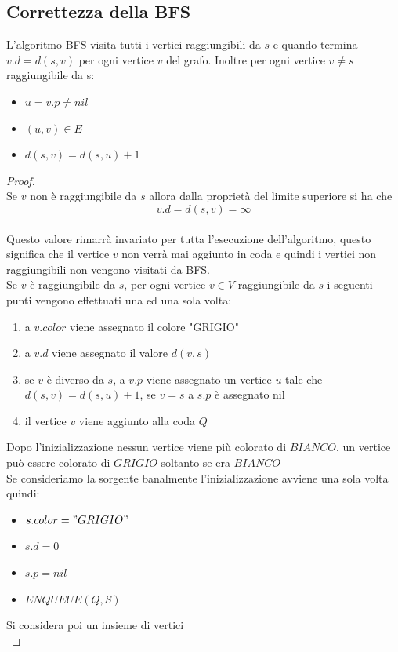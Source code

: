 \subsection{Correttezza della BFS}
L’algoritmo BFS visita tutti i vertici raggiungibili da $s$ e quando termina $v.d = d(s, v)$ per
ogni vertice $v$ del grafo. Inoltre per ogni vertice $v \neq s$ raggiungibile da s:
\begin{itemize}
    \item $u=v.p \neq nil$
    \item $(u,v) \in E$
    \item $d(s,v) = d(s,u)+1$
\end{itemize}
\begin{proof}
    \leavevmode\\
Se $v$ non è raggiungibile da $s$ allora dalla proprietà del limite superiore si ha che\\
$$v.d=d(s,v)=\infty$$\\
Questo valore rimarrà invariato per tutta l’esecuzione dell’algoritmo, questo significa che il
vertice $v$ non verrà mai aggiunto in coda e quindi i vertici non raggiungibili non vengono visitati
da BFS.\\
Se $v$ è raggiungibile da $s$, per ogni vertice $v \in V$ raggiungibile da $s$ i seguenti punti vengono
effettuati una ed una sola volta:
\begin{enumerate}
    \item a $v.color$ viene assegnato il colore "GRIGIO"
    \item a $v.d$ viene assegnato il valore $d(v,s)$
    \item se $v$ è diverso da $s$, a $v.p$ viene assegnato un vertice $u$ tale che $d(s,v)=d(s,u)+1$, se $v=s$ a $s.p$ è assegnato nil
    \item il vertice $v$ viene aggiunto alla coda $Q$
\end{enumerate}
\noindent Dopo l'inizializzazione nessun vertice viene più colorato di $BIANCO$, 
un vertice può essere colorato di $GRIGIO$ soltanto se era $BIANCO$\\ 
Se consideriamo la sorgente banalmente l'inizializzazione avviene una sola volta quindi:
\begin{itemize}
    \item $s.color="GRIGIO"$
    \item $s.d=0$
    \item $s.p=nil$
    \item $ENQUEUE(Q, S)$
\end{itemize}
\noindent Si considera poi un insieme di vertici\\

\end{proof}
